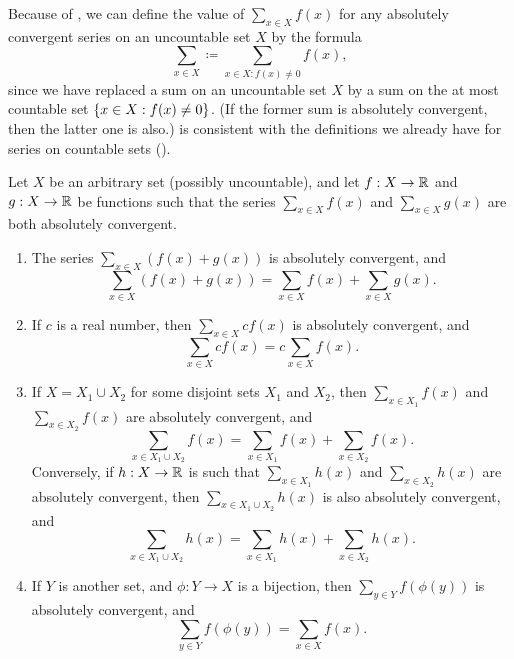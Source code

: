 \begin{note}
  Because of , we can define the value of \(\sum_{x \in X} f(x)\) for any absolutely convergent series on an uncountable set \(X\) by the formula
  \[
    \sum_{x \in X} \coloneqq \sum_{x \in X : f(x) \neq 0} f(x),
  \]
  since we have replaced a sum on an uncountable set \(X\) by a sum on the at most countable set \(\left\lbrace x \in X : f(x) \neq 0\right\rbrace\).
  (If the former sum is absolutely convergent, then the latter one is also.)
   is consistent with the definitions we already have for series on countable sets ().
\end{note}

\begin{prop}\label{i:8.2.6}
  Let \(X\) be an arbitrary set (possibly uncountable), and let \(f : X \to \mathbb{R}\) and \(g : X \to \mathbb{R}\) be functions such that the series \(\sum_{x \in X} f(x)\) and \(\sum_{x \in X} g(x)\) are both absolutely convergent.
  \begin{enumerate}
    \item\label{i:8.2.6.a} The series \(\sum_{x \in X} (f(x) + g(x))\) is absolutely convergent, and
    \[
      \sum_{x \in X} (f(x) + g(x)) = \sum_{x \in X} f(x) + \sum_{x \in X} g(x).
    \]
    \item\label{i:8.2.6.b} If \(c\) is a real number, then \(\sum_{x \in X} cf(x)\) is absolutely convergent, and
    \[
      \sum_{x \in X} cf(x) = c \sum_{x \in X} f(x).
    \]
    \item\label{i:8.2.6.c} If \(X = X_1 \cup X_2\) for some disjoint sets \(X_1\) and \(X_2\), then \(\sum_{x \in X_1} f(x)\) and \\
    \(\sum_{x \in X_2} f(x)\) are absolutely convergent, and
    \[
      \sum_{x \in X_1 \cup X_2} f(x) = \sum_{x \in X_1} f(x) + \sum_{x \in X_2} f(x).
    \]
    Conversely, if \(h : X \to \mathbb{R}\) is such that \(\sum_{x \in X_1} h(x)\) and \(\sum_{x \in X_2} h(x)\) are absolutely convergent, then \(\sum_{x \in X_1 \cup X_2} h(x)\) is also absolutely convergent, and
    \[
      \sum_{x \in X_1 \cup X_2} h(x) = \sum_{x \in X_1} h(x) + \sum_{x \in X_2} h(x).
    \]
    \item\label{i:8.2.6.d} If \(Y\) is another set, and \(\phi : Y \to X\) is a bijection, then \(\sum_{y \in Y} f(\phi(y))\) is absolutely convergent, and
    \[
      \sum_{y \in Y} f(\phi(y)) = \sum_{x \in X} f(x).
    \]
  \end{enumerate}
\end{prop}

